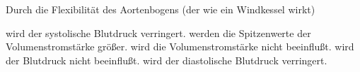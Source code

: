 \documentclass[11pt]{exam}
\begin{document}
\begin{questions}
\vspace{3mm}\question Durch die Flexibilität des Aortenbogens (der wie ein Windkessel wirkt)

\begin{choices}
	\choice wird der systolische Blutdruck verringert.
	\choice werden die Spitzenwerte der Volumenstromstärke größer.
	\choice wird die Volumenstromstärke nicht beeinflußt.
	\choice wird der Blutdruck nicht beeinflußt.
	\choice wird der diastolische Blutdruck verringert.
\end{choices}

\vspace{3mm}\end{questions}
\end{document}
